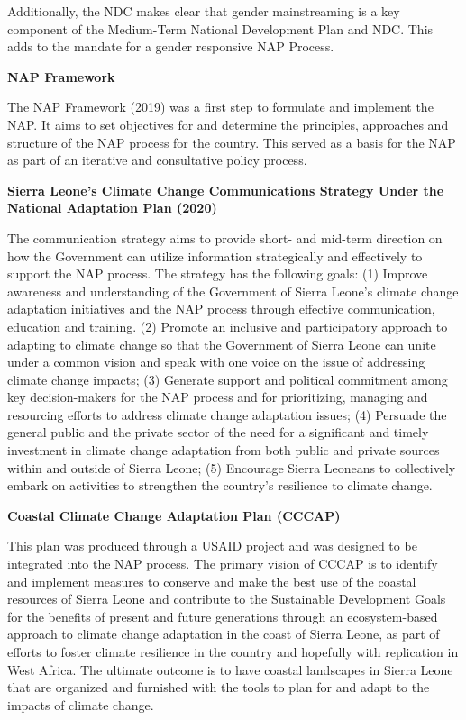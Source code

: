 \documentclass[
]{book}
\begin{document}
Additionally, the NDC makes clear that gender mainstreaming is a key component of the Medium-Term National Development Plan and NDC. This adds to the mandate for a gender responsive NAP Process.

\textbf{NAP Framework}

The NAP Framework (2019) was a first step to formulate and implement the NAP. It aims to set objectives for and determine the principles, approaches and structure of the NAP process for the country. This served as a basis for the NAP as part of an iterative and consultative policy process.

\textbf{Sierra Leone's Climate Change Communications Strategy Under the National Adaptation Plan (2020)}

The communication strategy aims to provide short- and mid-term direction on how the Government can utilize information strategically and effectively to support the NAP process. The strategy has the following goals: (1) Improve awareness and understanding of the Government of Sierra Leone's climate change adaptation initiatives and the NAP process through effective communication, education and training. (2) Promote an inclusive and participatory approach to adapting to climate change so that the Government of Sierra Leone can unite under a common vision and speak with one voice on the issue of addressing climate change impacts; (3) Generate support and political commitment among key decision-makers for the NAP process and for prioritizing, managing and resourcing efforts to address climate change adaptation issues; (4) Persuade the general public and the private sector of the need for a significant and timely investment in climate change adaptation from both public and private sources within and outside of Sierra Leone; (5) Encourage Sierra Leoneans to collectively embark on activities to strengthen the country's resilience to climate change.

\textbf{Coastal Climate Change Adaptation Plan (CCCAP)}

This plan was produced through a USAID project and was designed to be integrated into the NAP process. The primary vision of CCCAP is to identify and implement measures to conserve and make the best use of the coastal resources of Sierra Leone and contribute to the Sustainable Development Goals for the benefits of present and future generations through an ecosystem-based approach to climate change adaptation in the coast of Sierra Leone, as part of efforts to foster climate resilience in the country and hopefully with replication in West Africa. The ultimate outcome is to have coastal landscapes in Sierra Leone that are organized and furnished with the tools to plan for and adapt to the impacts of climate change.
\end{document}
